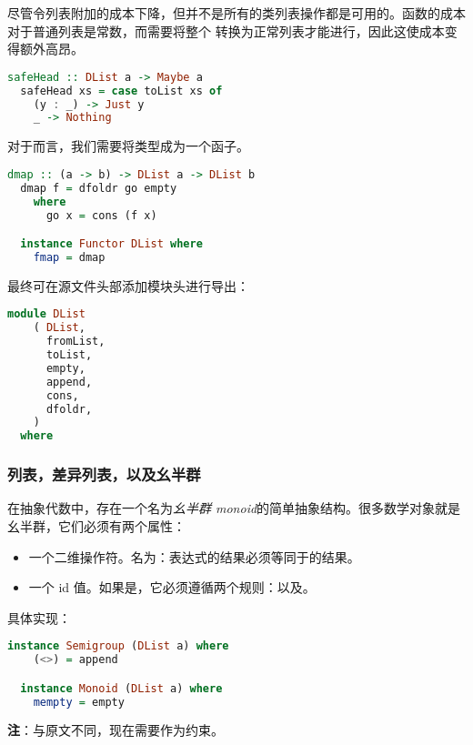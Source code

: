 \documentclass[./main.tex]{subfiles}
\begin{document}
尽管令列表附加的成本下降，但并不是所有的类列表操作都是可用的。函数的成本对于普通列表是常数，而需要将整个
转换为正常列表才能进行，因此这使成本变得额外高昂。

\begin{lstlisting}[language=Haskell]
  safeHead :: DList a -> Maybe a
  safeHead xs = case toList xs of
    (y : _) -> Just y
    _ -> Nothing
\end{lstlisting}

对于而言，我们需要将类型成为一个函子。

\begin{lstlisting}[language=Haskell]
  dmap :: (a -> b) -> DList a -> DList b
  dmap f = dfoldr go empty
    where
      go x = cons (f x)

  instance Functor DList where
    fmap = dmap
\end{lstlisting}

最终可在源文件头部添加模块头进行导出：

\begin{lstlisting}[language=Haskell]
  module DList
    ( DList,
      fromList,
      toList,
      empty,
      append,
      cons,
      dfoldr,
    )
  where
\end{lstlisting}

\subsubsection*{列表，差异列表，以及幺半群}

在抽象代数中，存在一个名为\textit{幺半群 monoid}的简单抽象结构。很多数学对象就是幺半群，它们必须有两个属性：

\begin{itemize}
  \item 一个二维操作符。名为\acode{(*)}：表达式的结果必须等同于的结果。
  \item 一个 id 值。如果是，它必须遵循两个规则：以及。
\end{itemize}

具体实现：

\begin{lstlisting}[language=Haskell]
  instance Semigroup (DList a) where
    (<>) = append

  instance Monoid (DList a) where
    mempty = empty
\end{lstlisting}

\textbf{注}：与原文不同，现在需要作为约束。
\end{document}
